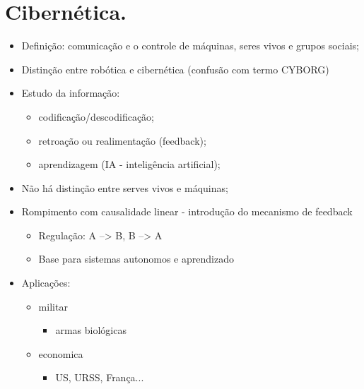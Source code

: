 \documentclass[a4paper,12pt]{article}
\begin{document}
\section{Cibernética.}

\begin{itemize}
\item Definição: comunicação e o controle de máquinas, seres vivos e grupos sociais;
\item Distinção entre robótica e cibernética (confusão com termo CYBORG)
\item Estudo da informação:
\begin{itemize}
\item codificação/descodificação;
\item retroação ou realimentação (feedback);
\item aprendizagem (IA - inteligência artificial);
\end{itemize}
\item Não há distinção entre serves vivos e máquinas;
\item Rompimento com causalidade linear - introdução do mecanismo de feedback
\begin{itemize}
\item Regulação: A --> B, B --> A
\item Base para sistemas autonomos e aprendizado
\end{itemize}
\item Aplicações:
\begin{itemize}
\item militar
\begin{itemize}
\item armas biológicas
\end{itemize}
\item economica
\begin{itemize}
\item US, URSS, França...
\end{itemize}
\end{itemize}
\end{itemize}







\end{document}

